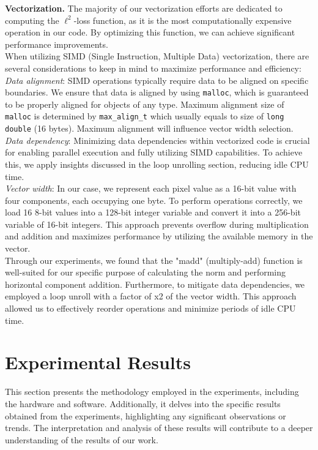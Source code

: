 \documentclass[letterpaper]{article}
\newcommand{\mypar}[1]{{\bf #1.}}
\begin{document}
\mypar{Vectorization}
The majority of our vectorization efforts are dedicated to computing the $\ell^2$-loss function, as it is the most computationally expensive operation in our code. By optimizing this function, we can achieve significant performance improvements. \\
When utilizing SIMD (Single Instruction, Multiple Data) vectorization, there are several considerations to keep in mind to maximize performance and efficiency: \\ 
\textit{Data alignment}: SIMD operations typically require data to be aligned on specific boundaries. We ensure that data is aligned by using \texttt{malloc}, which is guaranteed to be properly aligned for objects of any type. Maximum alignment size of \texttt{malloc} is determined by \texttt{max\_align\_t} which usually equals to size of \texttt{long double} (16 bytes). Maximum alignment will influence vector width selection.  \\
\textit{Data dependency}: Minimizing data dependencies within vectorized code is crucial for enabling parallel execution and fully utilizing SIMD capabilities. To achieve this, we apply insights discussed in the loop unrolling section, reducing idle CPU time. \\
\textit{Vector width}: In our case, we represent each pixel value as a 16-bit value with four components, each occupying one byte. To perform operations correctly, we load 16 8-bit values into a 128-bit integer variable and convert it into a 256-bit variable of 16-bit integers. This approach prevents overflow during multiplication and addition and maximizes performance by utilizing the available memory in the vector.\\

Through our experiments, we found that the "madd" (multiply-add) function is well-suited for our specific purpose of calculating the norm and performing horizontal component addition.
Furthermore, to mitigate data dependencies, we employed a loop unroll with a factor of x2 of the vector width. This approach allowed us to effectively reorder operations and minimize periods of idle CPU time. 

\section{Experimental Results}\label{sec:exp}

This section presents the methodology employed in the experiments, including the hardware and software. Additionally, it delves into the specific results obtained from the experiments, highlighting any significant observations or trends. The interpretation and analysis of these results will contribute to a deeper understanding of the results of our work.
\end{document}
